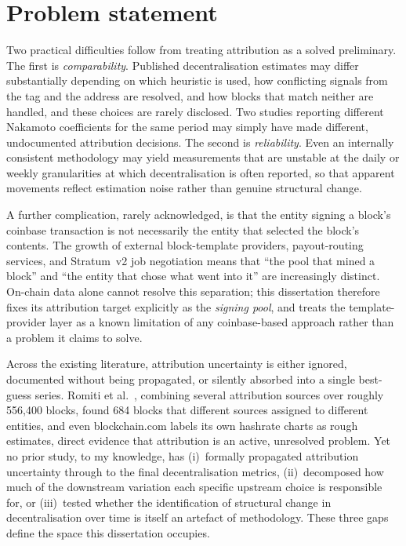 \documentclass[logo,msc]{infthesis}           %
\begin{document}
\section{Problem statement}
\label{sec:intro-problem}
 
Two practical difficulties follow from treating attribution as a solved
preliminary. The first is \emph{comparability}. Published decentralisation
estimates may differ substantially depending on which heuristic is used, how
conflicting signals from the tag and the address are resolved, and how blocks
that match neither are handled, and these choices are rarely disclosed. Two
studies reporting different Nakamoto coefficients for the same period may
simply have made different, undocumented attribution decisions. The second is
\emph{reliability}. Even an internally consistent methodology may yield
measurements that are unstable at the daily or weekly granularities at which
decentralisation is often reported, so that apparent movements reflect
estimation noise rather than genuine structural change.
 
A further complication, rarely acknowledged, is that the entity signing a
block's coinbase transaction is not necessarily the entity that selected the
block's contents. The growth of external block-template providers,
payout-routing services, and Stratum~v2 job negotiation means that ``the pool
that mined a block'' and ``the entity that chose what went into it'' are
increasingly distinct. On-chain data alone cannot resolve this separation;
this dissertation therefore fixes its attribution target explicitly as the
\emph{signing pool}, and treats the template-provider layer as a known
limitation of any coinbase-based approach rather than a problem it claims to
solve.
 
Across the existing literature, attribution uncertainty is either ignored,
documented without being propagated, or silently absorbed into a single
best-guess series. Romiti et al.~\cite{romiti2019deep}, combining several
attribution sources over roughly 556{,}400 blocks, found 684 blocks that
different sources assigned to different entities, and even blockchain.com
labels its own hashrate charts as rough estimates, direct evidence that
attribution is an active, unresolved problem. Yet no prior study, to my
knowledge, has (i)~formally propagated attribution uncertainty through to the
final decentralisation metrics, (ii)~decomposed how much of the downstream
variation each specific upstream choice is responsible for, or (iii)~tested
whether the identification of structural change in decentralisation over time
is itself an artefact of methodology. These three gaps define the space this
dissertation occupies.
 
\end{document}
